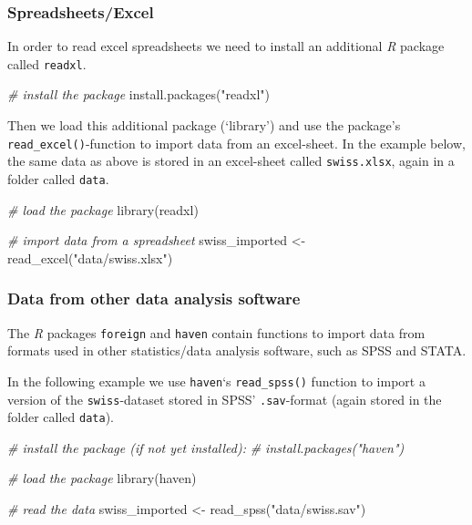 \documentclass[
  12pt,
]{style/krantz}
\newenvironment{Shaded}{\begin{snugshade}}{\end{snugshade}}
\newcommand{\CommentTok}[1]{\textcolor[rgb]{0.56,0.35,0.01}{\textit{#1}}}
\newcommand{\FunctionTok}[1]{\textcolor[rgb]{0.00,0.00,0.00}{#1}}
\newcommand{\NormalTok}[1]{#1}
\newcommand{\OtherTok}[1]{\textcolor[rgb]{0.56,0.35,0.01}{#1}}
\newcommand{\StringTok}[1]{\textcolor[rgb]{0.31,0.60,0.02}{#1}}
\begin{document}
\hypertarget{spreadsheetsexcel}{%
\subsubsection{Spreadsheets/Excel}\label{spreadsheetsexcel}}

In order to read excel spreadsheets we need to install an additional \emph{R} package called \texttt{readxl}.

\begin{Shaded}
\begin{Highlighting}[]
\CommentTok{\# install the package }
\FunctionTok{install.packages}\NormalTok{(}\StringTok{"readxl"}\NormalTok{)}
\end{Highlighting}
\end{Shaded}

Then we load this additional package (`library') and use the package's \texttt{read\_excel()}-function to import data from an excel-sheet. In the example below, the same data as above is stored in an excel-sheet called \texttt{swiss.xlsx}, again in a folder called \texttt{data}.

\begin{Shaded}
\begin{Highlighting}[]
\CommentTok{\# load the package}
\FunctionTok{library}\NormalTok{(readxl)}

\CommentTok{\# import data from a spreadsheet}
\NormalTok{swiss\_imported }\OtherTok{\textless{}{-}} \FunctionTok{read\_excel}\NormalTok{(}\StringTok{"data/swiss.xlsx"}\NormalTok{)}
\end{Highlighting}
\end{Shaded}

\hypertarget{data-from-other-data-analysis-software}{%
\subsubsection{Data from other data analysis software}\label{data-from-other-data-analysis-software}}

The \emph{R} packages \texttt{foreign} and \texttt{haven} contain functions to import data from formats used in other statistics/data analysis software, such as SPSS and STATA.

In the following example we use \texttt{haven}`s \texttt{read\_spss()} function to import a version of the \texttt{swiss}-dataset stored in SPSS' \texttt{.sav}-format (again stored in the folder called \texttt{data}).

\begin{Shaded}
\begin{Highlighting}[]
\CommentTok{\# install the package (if not yet installed):}
\CommentTok{\# install.packages("haven")}

\CommentTok{\# load the package}
\FunctionTok{library}\NormalTok{(haven)}

\CommentTok{\# read the data}
\NormalTok{swiss\_imported }\OtherTok{\textless{}{-}} \FunctionTok{read\_spss}\NormalTok{(}\StringTok{"data/swiss.sav"}\NormalTok{)}
\end{Highlighting}
\end{Shaded}
\end{document}
